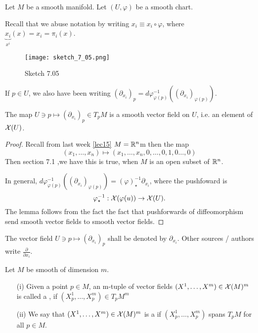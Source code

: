 Let \(M\) be a smooth manifold. Let \((U,\varphi)\) be a smooth chart. 

Recall that we abuse notation by writing \(x_i\equiv x_i\circ \varphi\), where \(\underbrace{x_i}_{x^i}(x)=x_i=\pi_i(x)\).
\begin{figure}[H]\label{fig:7.05}
    \centering
    \texttt{[image: sketch\_7\_05.png]}
    \caption{Sketch 7.05}
\end{figure}

If \(p\in U\), we also have been writing \((\partial_{x_i})_p=d\varphi_{\varphi(p)}^{-1}((\partial_{x_i})_{\varphi(p)})\).

\begin{lemma}\label{lem:7.7}
    The map \(U\ni p\mapsto (\partial_{x_i})_p\in T_p M\) is a smooth vector field on \(U\), i.e. an element 
    of \(\mathcal{X}(U)\).
\end{lemma}

\begin{proof}
    Recall from last week \ref{lec15} %
    \(M=\mathbb{R}^n\)m then the map \[(x_1,\dots,x_n)\mapsto (x_1,\dots,x_n,0,\dots,0,1,0\dots,0)\]
    Then section 7.1 %
    ,we have this is true, when \(M\) is an open subset of \(\mathbb{R}^n\).

    In general, \(d\varphi_{\varphi(p)}^{-1}((\partial_{x_i})_{\varphi(p)})=(\varphi)^{-1}_\star \partial_{x_i}\), where the pushfoward is 
    \[\varphi_\star^{-1}:\mathcal{X}(\varphi(u))\to\mathcal{X}(U).\]
    The lemma follows from the fact the fact that pushforwards of diffeomorphism send smooth vector fields to 
    smooth vector fields.
\end{proof}

 The vector field \(U\ni p\mapsto (\partial_{x_i})_p\) shall be denoted by \(\partial_{x_i}\).
Other sources / authors write \(\frac{\partial}{\partial x_i}\).

\begin{definition*}
    Let \(M\) be smooth of dimension \(m\).
    \begin{enumerate}
        \item[(i)] Given a point \(p\in M\), an m-tuple of vector fields \((X^1,\dots,X^m)\in \mathcal{X}(M)^m\) is called a , if \((X_p^1,\dots,X_p^m)\in T_p M^m\)
        \item[(ii)] We say that \((X^1,\dots,X^m)\in \mathcal{X}(M)^m\) is a  if \((X_p^1,\dots,X_p^m)\) spans \(T_pM\) for all \(p\in M\). 
    \end{enumerate}
\end{definition*}

